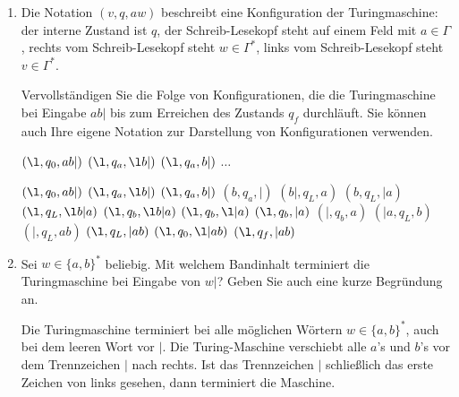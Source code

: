 \documentclass{bschlangaul-aufgabe}
\begin{document}
\begin{enumerate}


\item Die Notation $(v,q,aw)$ beschreibt eine Konfiguration der
Turingmaschine: der interne Zustand ist $q$, der Schreib-Lesekopf steht
auf einem Feld mit $a \in \Gamma$, rechts vom Schreib-Lesekopf steht $w
\in \Gamma^*$, links vom Schreib-Lesekopf steht $v \in \Gamma^*$.

Vervollständigen Sie die Folge von Konfigurationen, die die
Turingmaschine bei Eingabe $ab|$ bis zum Erreichen des Zustands $q_f$
durchläuft. Sie können auch Ihre eigene Notation zur Darstellung von
Konfigurationen verwenden.

\setlength{\leftskip}{3cm}

$(\l, q_0, a b | )$ \p
$(\l, q_a, \l b | )$ \p
$(\l, q_a, b | )$ \p
$\dots$

\setlength{\leftskip}{0pt}

\begin{bAntwort}
$(\l, q_0, a b | )$ \p %
$(\l, q_a, \l b | )$ \p %
$(\l, q_a, b | )$ \p %
$(b, q_a, |)$ \p %
$(b|, q_L, a)$ \p %
$(b, q_L, | a)$ \p %
$(\l, q_L, \l b | a)$ \p %
$(\l, q_b, \l b | a)$ \p %
$(\l, q_b, \l | a)$ \p %
$(\l, q_b, | a)$ \p %
$(|, q_b, a)$ \p %
$(|a, q_L, b)$ \p %
$(|, q_L, a b)$ \p %
$(\l, q_L, | a b)$ \p %
$(\l, q_0, \l | a b)$ \p %
$(\l, q_f, | a b)$ %
\end{bAntwort}


\item Sei $w \in \{ a, b \}^*$ beliebig. Mit welchem Bandinhalt
terminiert die Turingmaschine bei Eingabe von $w|$? Geben Sie auch eine
kurze Begründung an.

\begin{bAntwort}
Die Turingmaschine terminiert bei alle möglichen Wörtern $w \in \{ a, b
\}^*$, auch bei dem leeren Wort vor $|$. Die Turing-Maschine verschiebt
alle $a$’s und $b$’s vor dem Trennzeichen $|$ nach rechts.
Ist das Trennzeichen $|$ schließlich das erste Zeichen von links
gesehen, dann terminiert die Maschine.
\end{bAntwort}
\end{enumerate}
\end{document}
